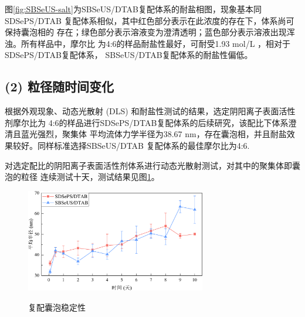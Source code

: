 \documentclass[bachelor,winfonts,replaceperiod]{jnuthesis}
\begin{document}
    图\ref{fig:SBSeUS-salt}为SBSeUS/DTAB复配体系的耐盐相图，现象基本同SDSePS/DTAB
    复配体系相似，其中红色部分表示在此浓度的存在下，体系尚可保持囊泡相的
    存在；绿色部分表示溶液变为澄清透明；蓝色部分表示溶液出现浑浊。所有样品中，摩尔比
    为4:6的样品耐盐性最好，可耐受1.93 mol/L ，相对于SDSePS/DTAB复配体系，
    SBSeUS/DTAB复配体系的耐盐性偏低。
    
    \subsection*{(2) 粒径随时间变化}
    根据外观现象、动态光散射 (DLS) 和耐盐性测试的结果，选定阴阳离子表面活性剂摩尔比为
    4:6的样品进行SDSePS/DTAB复配体系的后续研究，该配比下体系澄清且蓝光强烈，聚集体
    平均流体力学半径为38.67 nm，存在囊泡相，并且耐盐效果较好。同样标准选择SBSeUS/DTAB
    复配体系的最佳摩尔比为4:6.
    
    对选定配比的阴阳离子表面活性剂体系进行动态光散射测试，对其中的聚集体即囊泡的粒径
    连续测试十天，测试结果见图\ref{fig:vesicle-time-stability}。
    \begin{figure}[htbp]
        \centering
        \includegraphics[width=0.7\textwidth]{figure/vesicle-time-stability.pdf}\\
        \caption{复配囊泡稳定性}\label{fig:vesicle-time-stability}
    \end{figure}
\end{document}

